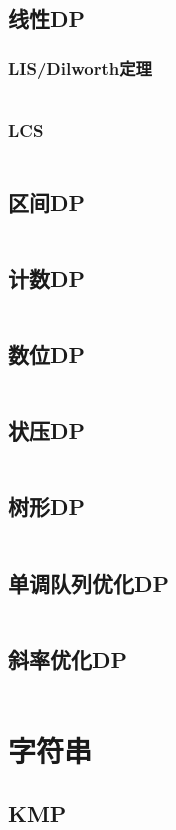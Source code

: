 \documentclass[a4paper,12pt]{article}
\begin{document}
\subsection{线性DP}
\subsubsection{LIS/Dilworth定理}
\inputminted[breaklines]{c++}{dp/linear/lis.cc}
\subsubsection{LCS}
\inputminted[breaklines]{c++}{dp/linear/lcs.cc}
\subsection{区间DP}
\inputminted[breaklines]{c++}{dp/interval.cc}
\subsection{计数DP}
\inputminted[breaklines]{c++}{dp/jishu.cc}
\subsection{数位DP}
\inputminted[breaklines]{c++}{dp/shuwei.cc}
\subsection{状压DP}
\inputminted[breaklines]{c++}{dp/zhuangya.cc}
\subsection{树形DP}
\inputminted[breaklines]{c++}{dp/treedp.cc}
\subsection{单调队列优化DP}
\inputminted[breaklines]{c++}{dp/dddl.cc}
\subsection{斜率优化DP}
\inputminted[breaklines]{c++}{dp/xielv.cc}


\newpage
\section{字符串}
\subsection{KMP}
\inputminted[breaklines]{c++}{string/kmp.cc}
\end{document}
